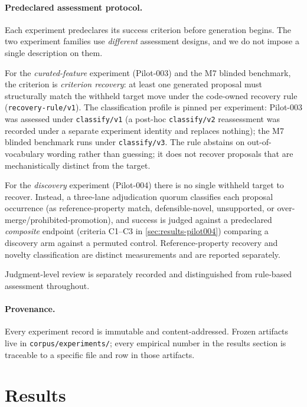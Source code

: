 \documentclass[11pt]{article}
\theoremstyle{gowthm}
\theoremstyle{gowplain}
\begin{document}
\paragraph{Predeclared assessment protocol.}
Each experiment predeclares its success criterion before generation begins.
The two experiment families use \emph{different} assessment designs, and we do
not impose a single description on them.

For the \emph{curated-feature} experiment (Pilot-003) and the M7 blinded
benchmark, the criterion is \emph{criterion recovery}: at least one generated
proposal must structurally match the withheld target move under the code-owned
recovery rule (\texttt{recovery-rule/v1}). The classification profile is pinned
per experiment: Pilot-003 was assessed under \texttt{classify/v1} (a post-hoc
\texttt{classify/v2} reassessment was recorded under a separate experiment
identity and replaces nothing); the M7 blinded benchmark runs under
\texttt{classify/v3}. The rule abstains on out-of-vocabulary wording rather
than guessing; it does not recover proposals that are mechanistically distinct
from the target.

For the \emph{discovery} experiment (Pilot-004) there is no single withheld
target to recover. Instead, a three-lane adjudication quorum classifies each
proposal occurrence (as reference-property match, defensible-novel,
unsupported, or over-merge/prohibited-promotion), and success is judged against
a predeclared \emph{composite} endpoint (criteria C1--C3 in
\cref{sec:results-pilot004}) comparing a discovery arm against a permuted
control. Reference-property recovery and novelty classification are distinct
measurements and are reported separately.

Judgment-level review is separately recorded and distinguished from rule-based
assessment throughout.

\paragraph{Provenance.}
Every experiment record is immutable and content-addressed. Frozen artifacts
live in \texttt{corpus/experiments/}; every empirical number in the results
section is traceable to a specific file and row in those artifacts.

\section{Results}
\label{sec:results}
\end{document}

